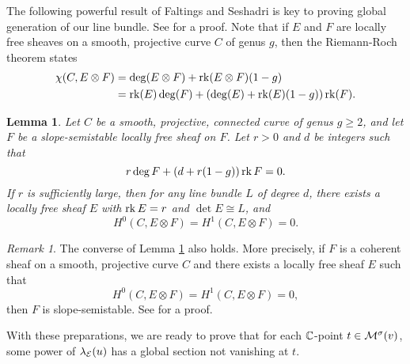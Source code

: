 \documentclass[letterpaper,12pt]{amsart}
\newtheorem{lem}[thm]{Lemma}
\theoremstyle{remark}
\newtheorem{rmk}[thm]{Remark}
\begin{document}
The following powerful result of Faltings and Seshadri is key to proving global generation of our line bundle. See \cite[Lemma 3.1, Remark 3.2]{seshadri} for a proof. Note that if $E$ and $F$ are locally free sheaves on a smooth, projective curve $C$ of genus $g$, then the Riemann-Roch theorem states
\begin{align*} 
    \chi(C, E \otimes F) & = \deg(E \otimes F) + \operatorname{\mathrm{rk}}(E \otimes F)(1-g) \\ 
    & = \operatorname{\mathrm{rk}}(E) \deg(F) + (\deg(E) + \operatorname{\mathrm{rk}}(E)(1-g))\operatorname{\mathrm{rk}}(F).
\end{align*}
\begin{lem}\label{seshadrimainlemma}
    Let $C$ be a smooth, projective, connected curve of genus $g \ge 2$, and let $F$ be a slope-semistable locally free sheaf on $F$. Let $r >0$ and $d$ be integers such that
    \[ r \deg F + (d + r(1-g)) \operatorname{\mathrm{rk}} F = 0. \]
    If $r$ is sufficiently large, then for any line bundle $L$ of degree $d$, there exists a locally free sheaf $E$ with $\operatorname{\mathrm{rk}} E = r$ and $\det E \cong L$, and
    \[ H^0(C, E \otimes F) = H^1(C, E \otimes F) = 0. \]
\end{lem}

\begin{rmk}
    The converse of Lemma \ref{seshadrimainlemma} also holds. More precisely, if $F$ is a coherent sheaf on a smooth, projective curve $C$ and there exists a locally free sheaf $E$ such that
    \[ H^0(C, E \otimes F) = H^1(C, E \otimes F) = 0, \]
    then $F$ is slope-semistable. See \cite[Theorem 2.13]{MS} for a proof.
\end{rmk}

With these preparations, we are ready to prove that for each $\mathbb{C}$-point $t \in \mathcal{M}^\sigma(v)$, some power of $\lambda_{\mathcal{E}}(u)$ has a global section not vanishing at $t$. 
\end{document}

